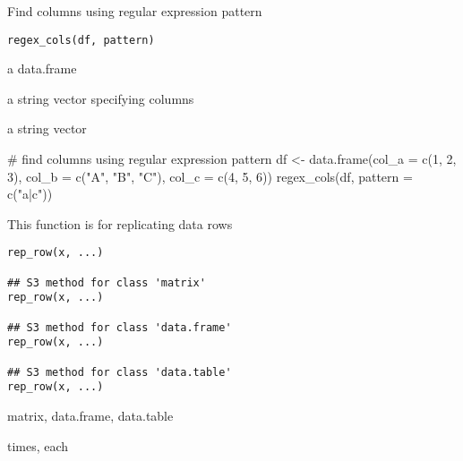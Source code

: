 \documentclass[letterpaper]{book}
\begin{document}
%
\begin{Description}
Find columns using regular expression pattern
\end{Description}
%
\begin{Usage}
\begin{verbatim}
regex_cols(df, pattern)
\end{verbatim}
\end{Usage}
%
\begin{Arguments}
\begin{ldescription}
\item[\code{df}] a data.frame

\item[\code{pattern}] a string vector specifying columns
\end{ldescription}
\end{Arguments}
%
\begin{Value}
a string vector
\end{Value}
%
\begin{Examples}
\begin{ExampleCode}
# find columns using regular expression pattern
df <- data.frame(col_a = c(1, 2, 3), col_b = c("A", "B", "C"), col_c = c(4, 5, 6))
regex_cols(df, pattern = c("a|c"))

\end{ExampleCode}
\end{Examples}
%
\begin{Description}
This function is for replicating data rows
\end{Description}
%
\begin{Usage}
\begin{verbatim}
rep_row(x, ...)

## S3 method for class 'matrix'
rep_row(x, ...)

## S3 method for class 'data.frame'
rep_row(x, ...)

## S3 method for class 'data.table'
rep_row(x, ...)
\end{verbatim}
\end{Usage}
%
\begin{Arguments}
\begin{ldescription}
\item[\code{x}] matrix, data.frame, data.table

\item[\code{...}] times, each
\end{ldescription}
\end{Arguments}
\end{document}
